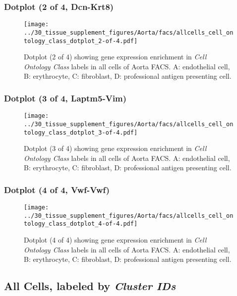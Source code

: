\clearpage

\subsubsection{Dotplot (2 of 4, Dcn-Krt8)}
\begin{figure}[h]
\centering
\texttt{[image: ../30\_tissue\_supplement\_figures/Aorta/facs/allcells\_cell\_ontology\_class\_dotplot\_2-of-4.pdf]}

\caption{ Dotplot (2 of 4)  showing gene expression enrichment in \emph{Cell Ontology Class} labels in all cells of Aorta FACS. A: endothelial cell, B: erythrocyte, C: fibroblast, D: professional antigen presenting cell.}
\end{figure}


\clearpage

\subsubsection{Dotplot (3 of 4, Laptm5-Vim)}
\begin{figure}[h]
\centering
\texttt{[image: ../30\_tissue\_supplement\_figures/Aorta/facs/allcells\_cell\_ontology\_class\_dotplot\_3-of-4.pdf]}

\caption{ Dotplot (3 of 4)  showing gene expression enrichment in \emph{Cell Ontology Class} labels in all cells of Aorta FACS. A: endothelial cell, B: erythrocyte, C: fibroblast, D: professional antigen presenting cell.}
\end{figure}


\clearpage

\subsubsection{Dotplot (4 of 4, Vwf-Vwf)}
\begin{figure}[h]
\centering
\texttt{[image: ../30\_tissue\_supplement\_figures/Aorta/facs/allcells\_cell\_ontology\_class\_dotplot\_4-of-4.pdf]}

\caption{ Dotplot (4 of 4)  showing gene expression enrichment in \emph{Cell Ontology Class} labels in all cells of Aorta FACS. A: endothelial cell, B: erythrocyte, C: fibroblast, D: professional antigen presenting cell.}
\end{figure}


\clearpage

\subsection{All Cells, labeled by \emph{Cluster IDs}}
